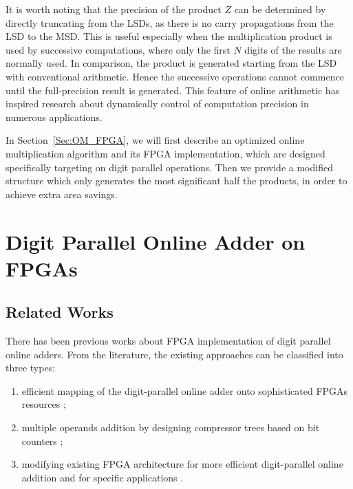 \documentclass[conference]{IEEEtran}
\begin{document}
It is worth noting that the precision of the product $Z$ can be determined by directly truncating from the LSDs, as there is no carry propagations from the LSD to the MSD. This is useful especially when the multiplication product is used by successive computations, where only the first $N$ digits of the results are normally used. In comparison, the product is generated starting from the LSD with conventional arithmetic. Hence the successive operations cannot commence until the full-precision result is generated. This feature of online arithmetic has inspired research about dynamically control of computation precision in numerous applications.


In Section~\ref{Sec:OM_FPGA}, we will first describe an optimized online multiplication algorithm and its FPGA implementation, which are designed specifically targeting on digit parallel operations. Then we provide a modified structure which only generates the most significant half the products, in order to achieve extra area savings.



\section{Digit Parallel Online Adder on FPGAs}\label{Sec:OA_FPGA}
\subsection{Related Works}
There has been previous works about FPGA implementation of digit parallel online adders. From the literature, the existing approaches can be classified into three types:

\begin{enumerate}
    \item efficient mapping of the digit-parallel online adder onto sophisticated FPGAs resources \cite{FPT09RA,ASAP09RA};
    \item multiple operands addition by designing compressor trees based on bit counters \cite{TC13RA,ASPDAC10RA_FPGA};
    \item modifying existing FPGA architecture for more efficient digit-parallel online addition \cite{DAC07_CounterTree} and for specific applications \cite{FPL09_onlineCCM}.
\end{enumerate}
\end{document}
